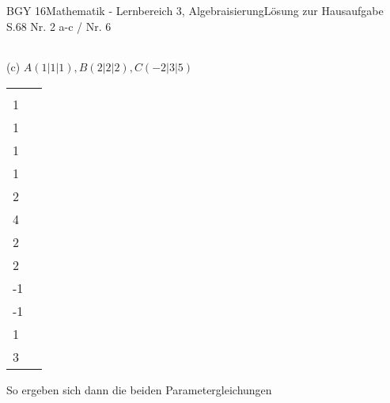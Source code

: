 \documentclass[oneside,openany,headings=optiontotoc,11pt,numbers=noenddot]{scrreprt}
\begin{document}
\begin{worksheet}{BGY 16}{Mathematik - Lernbereich 3, Algebraisierung}{Lösung zur Hausaufgabe S.68 Nr. 2 a-c / Nr. 6}
\begin{framed}
\begin{tabularx}{\textwidth}{X|X}
			\end{tabularx}
			\par\bigskip\noindent
			(c) \(A(1|1|1), B(2|2|2), C(-2|3|5)\)\\
			\begin{tabularx}{\textwidth}{X|X}
				\(\vec{p} = \vec{0A} = \left(\begin{matrix}1\\1\\1\end{matrix}\right), \vec{u_1} = \vec{AB} = \left(\begin{matrix}1\\1\\1\end{matrix}\right), \vec{v_1} = \vec{AC} = \left(\begin{matrix}-3\\2\\4\end{matrix}\right)\) & \(\vec{q} = \vec{0B} =  \left(\begin{matrix}2\\2\\2\end{matrix}\right), \vec{u_2} = \vec{BA} = \left(\begin{matrix}-1\\-1\\-1\end{matrix}\right), \vec{v_2} = \vec{BC} = \left(\begin{matrix}-4\\1\\3\end{matrix}\right)\)\\
			\end{tabularx}
			So ergeben sich dann die beiden Parametergleichungen\\
			\par\noindent
			\begin{tabularx}{\textwidth}{X|X}

\end{tabularx}
\end{framed}
\end{worksheet}
\end{document}
